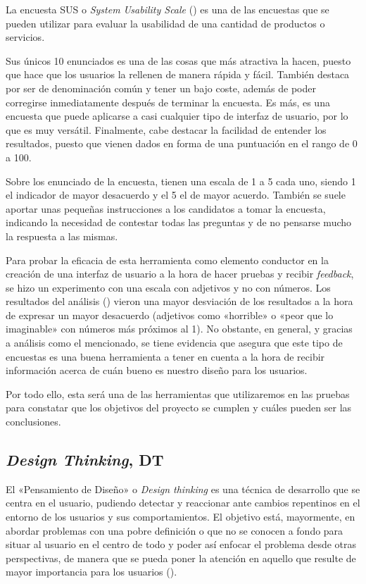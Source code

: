 La encuesta SUS o \textit{System Usability Scale} (\cite{sus}) es una de las encuestas que se pueden utilizar para evaluar la usabilidad de una cantidad de productos o servicios.

Sus únicos 10 enunciados es una de las cosas que más atractiva la hacen, puesto que hace que los usuarios la rellenen de manera rápida y fácil. También destaca por ser de denominación común y tener un bajo coste, además de poder corregirse inmediatamente después de terminar la encuesta. Es más, es una encuesta que puede aplicarse a casi cualquier tipo de interfaz de usuario, por lo que es muy versátil. Finalmente, cabe destacar la facilidad de entender los resultados, puesto que vienen dados en forma de una puntuación en el rango de 0 a 100.

Sobre los enunciado de la encuesta, tienen una escala de 1 a 5 cada uno, siendo 1 el indicador de mayor desacuerdo y el 5 el de mayor acuerdo. También se suele aportar unas pequeñas instrucciones a los candidatos a tomar la encuesta, indicando la necesidad de contestar todas las preguntas y de no pensarse mucho la respuesta a las mismas.

Para probar la eficacia de esta herramienta como elemento conductor en la creación de una interfaz de usuario a la hora de hacer pruebas y recibir \textit{feedback}, se hizo un experimento con una escala con adjetivos y no con números. Los resultados del análisis (\cite{sus}) vieron una mayor desviación de los resultados a la hora de expresar un mayor desacuerdo (adjetivos como «horrible» o «peor que lo imaginable» con números más próximos al 1). No obstante, en general, y gracias a análisis como el mencionado, se tiene evidencia que asegura que este tipo de encuestas es una buena herramienta a tener en cuenta a la hora de recibir información acerca de cuán bueno es nuestro diseño para los usuarios.

Por todo ello, esta será una de las herramientas que utilizaremos en las pruebas para constatar que los objetivos del proyecto se cumplen y cuáles pueden ser las conclusiones.

\subsection{\textit{Design Thinking}, DT}

El «Pensamiento de Diseño» o \textit{Design thinking} es una técnica de desarrollo que se centra en el usuario, pudiendo detectar y reaccionar ante cambios repentinos en el entorno de los usuarios y sus comportamientos. El objetivo está, mayormente, en abordar problemas con una pobre definición o que no se conocen a fondo para situar al usuario en el centro de todo y poder así enfocar el problema desde otras perspectivas, de manera que se pueda poner la atención en aquello que resulte de mayor importancia para los usuarios (\cite{dt}).

